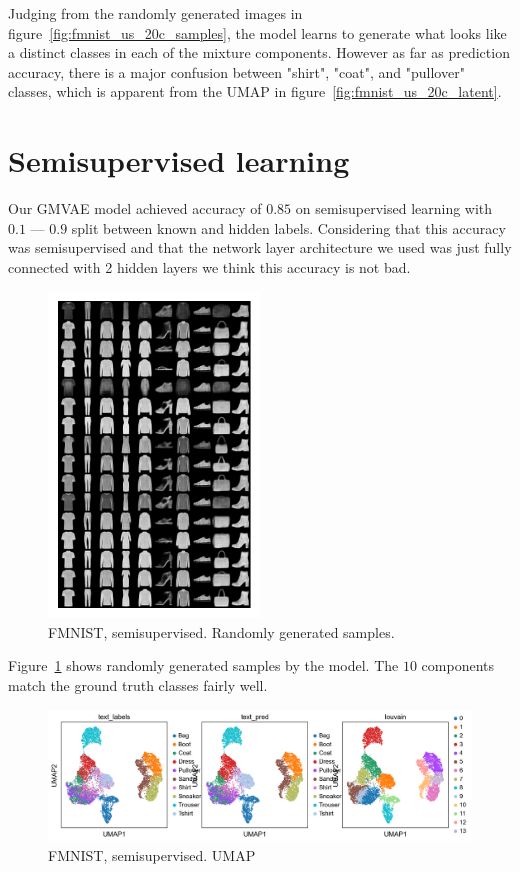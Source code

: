 \documentclass[11pt, a4paper]{report}
\theoremstyle{plain}
\theoremstyle{definition}
\theoremstyle{remark}
\begin{document}
Judging from the randomly generated images in
figure~\ref{fig:fmnist_us_20c_samples}, the model learns to 
generate what looks like a distinct classes in each of the mixture components.
However as far as prediction accuracy, there is a major confusion between
"shirt", "coat", and "pullover" classes, which is apparent from the UMAP in 
figure~\ref{fig:fmnist_us_20c_latent}.

\section{Semisupervised learning}

Our GMVAE model achieved accuracy of $0.85$ on semisupervised learning with
$0.1$ --- $0.9$ split between known and hidden labels. 
Considering that this accuracy was semisupervised and that the network 
layer architecture we used was just fully connected with 2 hidden layers 
we think this accuracy is not bad.

\begin{figure}[h]
\centering
\includegraphics[width=0.5\textwidth]{images/gmmvae_fmnist_ss_samples.png}
\caption{FMNIST, semisupervised. Randomly generated samples.}
\label{fig:fmnist_ss_samples}
\end{figure}

Figure~\ref{fig:fmnist_ss_samples} shows randomly generated samples 
by the model. The $10$ components match the ground truth classes
fairly well.

\begin{figure}[h]
\centering
\includegraphics[width=1.1\textwidth]{images/gmmvae_fmnist_ss_latent_umap.png}
\caption{FMNIST, semisupervised. UMAP}
\label{fig:fmnist_ss_latent}
\end{figure}
\end{document}
